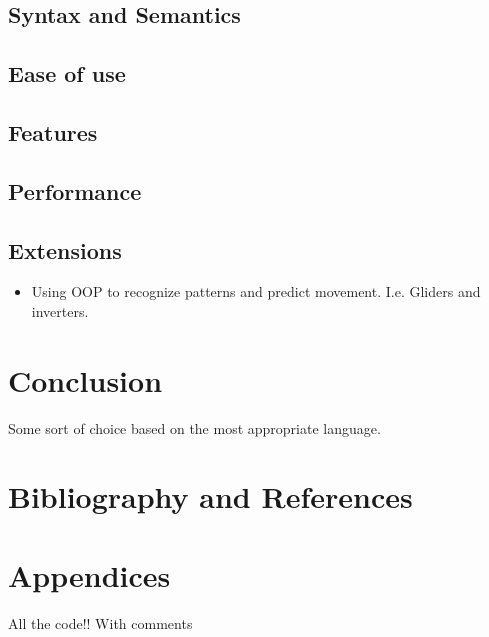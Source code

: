 \documentclass[11pt]{article} %
\begin{document}
\begin{itemize}
\subsection{Syntax and Semantics}
\subsection{Ease of use}
\subsection{Features}
\subsection{Performance}
\subsection{Extensions}
\begin{itemize}
\item Using OOP to recognize patterns and predict movement. I.e. Gliders and inverters.
\end{itemize}
\section{Conclusion}
Some sort of choice based on the most appropriate language.
\section{Bibliography and References}
\nocite{ref1}
\nocite{ref2}
\nocite{ref4}
\nocite{ref5}
\nocite{ref6}


\section{Appendices}
All the code!! With comments
\end{itemize}
\end{document}
